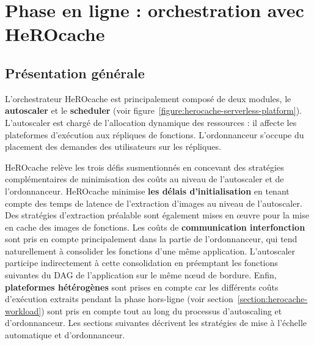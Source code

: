 \section{Phase en ligne : orchestration avec HeROcache} \label{section:herocache-contribution}

\subsection{Présentation générale}

L'orchestrateur HeROcache est principalement composé de deux modules, le \textbf{autoscaler} et le \textbf{scheduler} (voir figure~\ref{figure:herocache-serverless-platform}). L'autoscaler est chargé de l'allocation dynamique des ressources : il affecte les plateformes d'exécution aux répliques de fonctions. L'ordonnanceur s'occupe du placement des demandes des utilisateurs sur les répliques.

HeROcache relève les trois défis susmentionnés en concevant des stratégies complémentaires de minimisation des coûts au niveau de l'autoscaler et de l'ordonnanceur. HeROcache minimise \textbf{les délais d'initialisation} en tenant compte des temps de latence de l'extraction d'images au niveau de l'autoscaler. Des stratégies d'extraction préalable sont également mises en œuvre pour la mise en cache des images de fonctions. Les coûts de \textbf{communication interfonction} sont pris en compte principalement dans la partie de l'ordonnanceur, qui tend naturellement à consolider les fonctions d'une même application. L'autoscaler participe indirectement à cette consolidation en préemptant les fonctions suivantes du DAG de l'application sur le même nœud de bordure. Enfin, \textbf{plateformes hétérogènes} sont prises en compte car les différents coûts d'exécution extraits pendant la phase hors-ligne (voir section~\ref{section:herocache-workload}) sont pris en compte tout au long du processus d'autoscaling et d'ordonnanceur. Les sections suivantes décrivent les stratégies de mise à l'échelle automatique et d'ordonnanceur.

